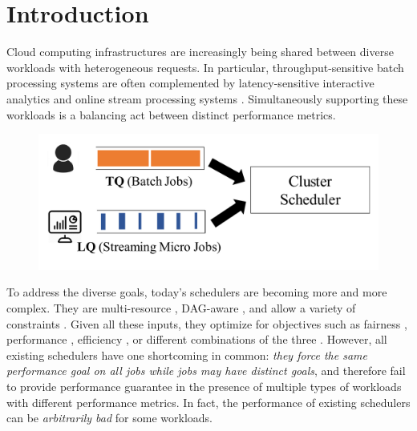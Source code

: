 \section{Introduction}

Cloud computing infrastructures are increasingly being shared between diverse workloads with heterogeneous requests. 
In particular, throughput-sensitive batch processing systems \cite{mapreduce, dryad, graphlab, tez} are often complemented by latency-sensitive interactive analytics \cite{spark, blinkdb, presto} and online stream processing systems \cite{spark-streaming, trident, millwheel, naiad, flink}.
% 
Simultaneously supporting these workloads is a balancing act between distinct performance metrics. 

\begin{figure}[!t]
  \centering
  \includegraphics[width=0.8\columnwidth]{fig/queues.pdf}%
  \caption{}%
  \label{fig:queues}
 	\vspace{-0.1in}
\end{figure}

To address the diverse goals, today's schedulers are becoming more and more complex.
They are multi-resource \cite{drf, tetris, multiresource-mungchiang, orchestra, pacman}, DAG-aware \cite{aalo, tetris, spark}, and allow a variety of constraints \cite{late, quincy, mantri, choosy, delay-scheduling}. 
Given all these inputs, they optimize for objectives such as fairness \cite{drf, jaffe-maxmin, drfq, hdrf}, performance \cite{sjf}, efficiency \cite{tetris}, or different combinations of the three \cite{carbyne, graphene}.
However, all existing schedulers have one shortcoming in common: \emph{they force the same performance goal on all jobs while jobs may have distinct goals}, and therefore fail to provide performance guarantee in the presence of multiple types of workloads with different performance metrics. 
In fact, the performance of existing schedulers can be \emph{arbitrarily bad} for some workloads.


